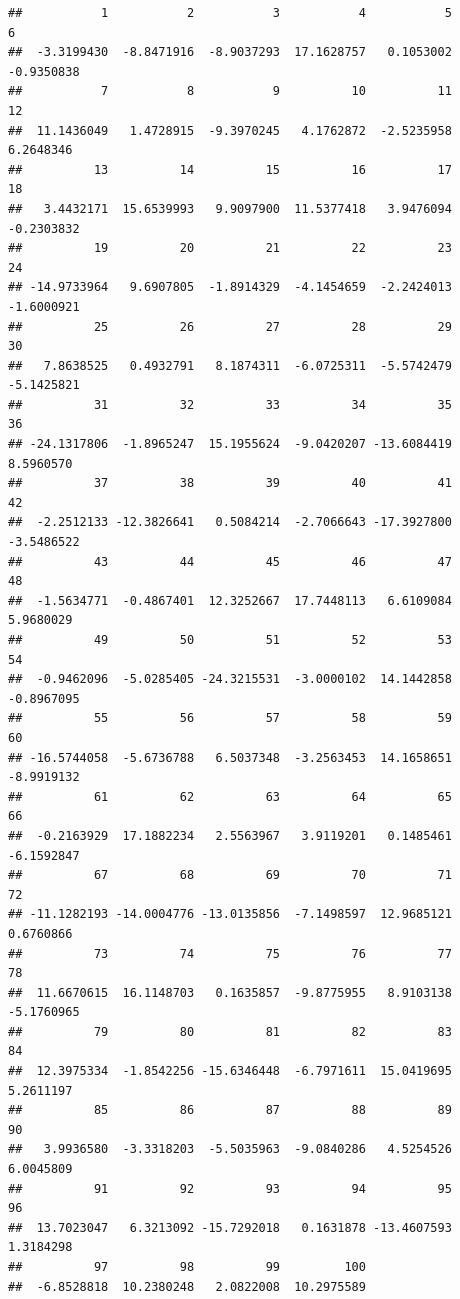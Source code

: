 \documentclass[]{book}
\theoremstyle{definition}
\theoremstyle{definition}
\theoremstyle{definition}
\theoremstyle{remark}
\begin{document}
\begin{verbatim}
##           1           2           3           4           5           6 
##  -3.3199430  -8.8471916  -8.9037293  17.1628757   0.1053002  -0.9350838 
##           7           8           9          10          11          12 
##  11.1436049   1.4728915  -9.3970245   4.1762872  -2.5235958   6.2648346 
##          13          14          15          16          17          18 
##   3.4432171  15.6539993   9.9097900  11.5377418   3.9476094  -0.2303832 
##          19          20          21          22          23          24 
## -14.9733964   9.6907805  -1.8914329  -4.1454659  -2.2424013  -1.6000921 
##          25          26          27          28          29          30 
##   7.8638525   0.4932791   8.1874311  -6.0725311  -5.5742479  -5.1425821 
##          31          32          33          34          35          36 
## -24.1317806  -1.8965247  15.1955624  -9.0420207 -13.6084419   8.5960570 
##          37          38          39          40          41          42 
##  -2.2512133 -12.3826641   0.5084214  -2.7066643 -17.3927800  -3.5486522 
##          43          44          45          46          47          48 
##  -1.5634771  -0.4867401  12.3252667  17.7448113   6.6109084   5.9680029 
##          49          50          51          52          53          54 
##  -0.9462096  -5.0285405 -24.3215531  -3.0000102  14.1442858  -0.8967095 
##          55          56          57          58          59          60 
## -16.5744058  -5.6736788   6.5037348  -3.2563453  14.1658651  -8.9919132 
##          61          62          63          64          65          66 
##  -0.2163929  17.1882234   2.5563967   3.9119201   0.1485461  -6.1592847 
##          67          68          69          70          71          72 
## -11.1282193 -14.0004776 -13.0135856  -7.1498597  12.9685121   0.6760866 
##          73          74          75          76          77          78 
##  11.6670615  16.1148703   0.1635857  -9.8775955   8.9103138  -5.1760965 
##          79          80          81          82          83          84 
##  12.3975334  -1.8542256 -15.6346448  -6.7971611  15.0419695   5.2611197 
##          85          86          87          88          89          90 
##   3.9936580  -3.3318203  -5.5035963  -9.0840286   4.5254526   6.0045809 
##          91          92          93          94          95          96 
##  13.7023047   6.3213092 -15.7292018   0.1631878 -13.4607593   1.3184298 
##          97          98          99         100 
##  -6.8528818  10.2380248   2.0822008  10.2975589
\end{verbatim}
\end{document}
